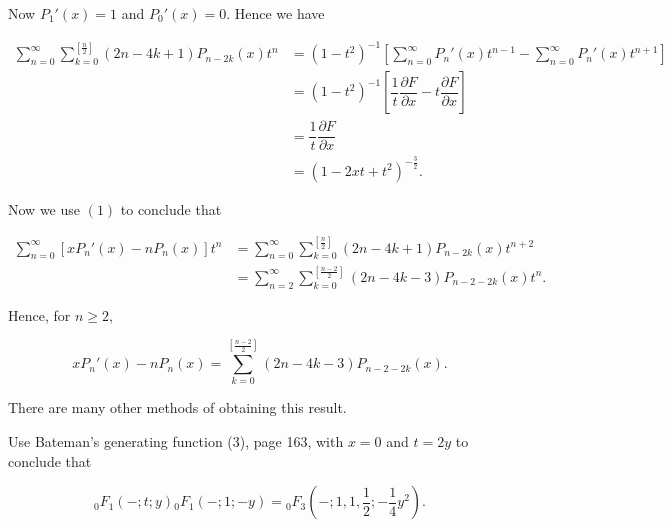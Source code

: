 \begin{solution}
Now $P_1'(x) = 1$ and $P_0'(x)=0$. Hence we have

$$\begin{array}{ll}
\displaystyle\sum_{n=0}^{\infty} \displaystyle\sum_{k=0}^{[\frac{n}{2}]} (2n - 4k+1)P_{n-2k}(x)t^n &= (1-t^2)^{-1} \left[ \displaystyle\sum_{n=0}^{\infty} P_n'(x) t^{n-1} - \displaystyle\sum_{n=0}^{\infty} P_n'(x) t^{n+1} \right] \\
&= (1-t^2)^{-1} \left[ \dfrac{1}{t} \dfrac{\partial F}{\partial x} - t \dfrac{\partial F}{\partial x} \right] \\
&= \dfrac{1}{t} \dfrac{\partial F}{\partial x} \\
&= (1 - 2xt+t^2)^{-\frac{3}{2}}.
\end{array}$$

Now we use $(1)$ to conclude that

$$\begin{array}{ll}
\displaystyle\sum_{n=0}^{\infty} [xP_n'(x) - nP_n(x)]t^n &= \displaystyle\sum_{n=0}^{\infty} \displaystyle\sum_{k=0}^{[\frac{n}{2}]} (2n-4k+1) P_{n-2k}(x)t^{n+2} \\
&= \displaystyle\sum_{n=2}^{\infty} \displaystyle\sum_{k=0}^{[\frac{n-2}{2}]} (2n-4k-3) P_{n-2-2k}(x)t^n.
\end{array}$$

Hence, for $n\geq 2$, 

$$x P_n'(x) - nP_n(x) = \displaystyle\sum_{k=0}^{[\frac{n-2}{2}]} (2n-4k-3)P_{n-2-2k}(x).$$

There are many other methods of obtaining this result.
\end{solution}
\begin{problem}\label{problem5chapter10}
Use Bateman's generating function (3), page 163, with $x=0$ and $t=2y$ to conclude that

$${}_0F_1(-;t;y) {}_0F_1(-;1;-y) = {}_0F_3 \left( -;1,1,\dfrac{1}{2};  - \dfrac{1}{4}y^2 \right).$$
\end{problem}
